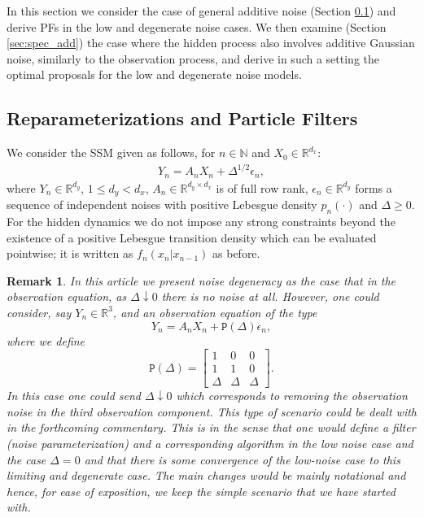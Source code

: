\documentclass[english,13pt]{article}
\numberwithin{equation}{section}
\newtheorem{rem}{Remark}[section]
\begin{document}
In this section we consider the case of general additive noise (Section \ref{sec:noise_add}) and derive PFs in the low and degenerate noise cases.  We then examine (Section \ref{sec:spec_add}) the case where the hidden process also involves additive Gaussian noise, similarly to the observation process, and derive in such a setting the optimal proposals for the low and degenerate noise models.

\subsection{Reparameterizations and Particle Filters}\label{sec:noise_add}

We consider the SSM given as follows,  for $n\in\mathbb{N}$ and $X_0\in\mathbb{R}^{d_x}$:
%
\begin{align}
\label{eq:obs-linear}
Y_n  = A_n X_n + \Delta^{1/2}\epsilon_n ,
\end{align}
%
where  $Y_n\in\mathbb{R}^{d_y}$,  $1\leq d_y < d_x$,  $A_n\in\mathbb{R}^{d_y\times d_x}$ is of full row rank,  $\epsilon_n\in\mathbb{R}^{d_y}$ forms a sequence of independent noises with positive Lebesgue density $p_n(\cdot)$
and $\Delta\geq 0$.  For the hidden dynamics we do not impose any strong constraints beyond the existence of a  positive Lebesgue transition density which can be evaluated pointwise; it is written as $f_n(x_n|x_{n-1})$ as before. 
\begin{rem}
In this article we present noise degeneracy as the case that in the observation equation,  as $\Delta\downarrow 0$ there is no noise at all.  However,  one could consider,  say $Y_n\in\mathbb{R}^3$,  and an observation equation of the type
$$
Y_n = A_n X_n + \mathtt{P}(\Delta)\epsilon_n,
$$
where we define
$$
\mathtt{P}(\Delta)=
\begin{bmatrix}
1 & 0 & 0\\
1 & 1 & 0 \\
\Delta & \Delta & \Delta
\end{bmatrix}.  
$$
In this case one could send $\Delta\downarrow 0$ which corresponds to removing the observation noise in the third observation component.  This type of scenario could be dealt with in the forthcoming commentary.
This is
in the sense that one would define a filter (noise parameterization) and a corresponding algorithm in the low noise case and the case $\Delta=0$ and that there is some convergence of the low-noise case to this limiting and degenerate case.  The main changes would be mainly notational and hence, for ease of exposition,  we keep the simple scenario that we have started with.
\end{rem}
\end{document}
